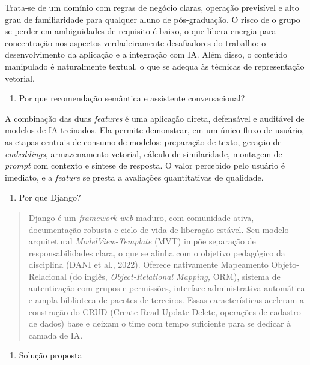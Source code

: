 \documentclass[
]{article}
\begin{document}
Trata-se de um domínio com regras de negócio claras, operação previsível
e alto grau de familiaridade para qualquer aluno de pós-graduação. O
risco de o grupo se perder em ambiguidades de requisito é baixo, o que
libera energia para concentração nos aspectos verdadeiramente
desafiadores do trabalho: o desenvolvimento da aplicação e a integração
com IA. Além disso, o conteúdo manipulado é naturalmente textual, o que
se adequa às técnicas de representação vetorial.

\begin{enumerate}
\def\labelenumi{\alph{enumi}.}
\setcounter{enumi}{1}
\item
  Por que recomendação semântica e assistente conversacional?
\end{enumerate}

A combinação das duas \emph{features} é uma aplicação direta, defensável
e auditável de modelos de IA treinados. Ela permite demonstrar, em um
único fluxo de usuário, as etapas centrais de consumo de modelos:
preparação de texto, geração de \emph{embeddings}, armazenamento
vetorial, cálculo de similaridade, montagem de \emph{prompt} com
contexto e síntese de resposta. O valor percebido pelo usuário é
imediato, e a \emph{feature} se presta a avaliações quantitativas de
qualidade.

\begin{enumerate}
\def\labelenumi{\alph{enumi}.}
\setcounter{enumi}{2}
\item
  Por que Django?
\end{enumerate}

\begin{quote}
Django é um \emph{framework} \emph{web} maduro, com comunidade ativa,
documentação robusta e ciclo de vida de liberação estável. Seu modelo
arquitetural \emph{ModelView-Template} (MVT) impõe separação de
responsabilidades clara, o que se alinha com o objetivo pedagógico da
disciplina (DANI et al., 2022). Oferece nativamente Mapeamento
Objeto-Relacional (do inglês, \emph{Object-Relational Mapping,} ORM),
sistema de autenticação com grupos e permissões, interface
administrativa automática e ampla biblioteca de pacotes de terceiros.
Essas características aceleram a construção do CRUD
(Create-Read-Update-Delete, operações de cadastro de dados) base e
deixam o time com tempo suficiente para se dedicar à camada de IA.
\end{quote}

\begin{enumerate}
\def\labelenumi{\arabic{enumi}.}
\item
  \protect{}\label{_Toc230227805}{}Solução proposta
\end{enumerate}
\end{document}
